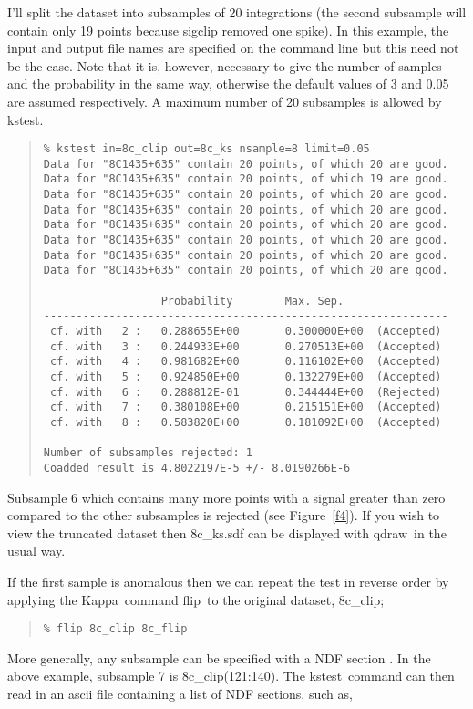 \documentclass[twoside,11pt,fleqn]{article}
\newenvironment{myquote}{\begin{quote}\begin{small}}{\end{small}\end{quote}}
\newcommand{\Kappa}{\xref{{\sc Kappa}}{sun95}{}}
\newcommand{\task}[1]{{\sf #1}}
\newcommand{\qdraw}{\xref{\task{qdraw}}{sun216}{QDRAW}}
\newcommand{\kstest}{\xref{\task{kstest}}{sun95}{KSTEST}}
\newcommand{\flip}{\xref{\task{flip}}{sun95}{FLIP}}
\newcommand{\xref}[3]{#1}
\begin{document}
I'll split the dataset into subsamples of 20 integrations (the second
subsample will contain only 19 points because sigclip removed one
spike). In this example, the input and output file names are specified
on the command line but this need not be the case.  Note that it is,
however, necessary to give the number of samples and the probability
in the same way, otherwise the default values of 3 and 0.05 are
assumed respectively. A maximum number of 20 subsamples is allowed by
\kstest.

\begin{myquote}
\begin{verbatim}
% kstest in=8c_clip out=8c_ks nsample=8 limit=0.05
Data for "8C1435+635" contain 20 points, of which 20 are good.
Data for "8C1435+635" contain 20 points, of which 19 are good.
Data for "8C1435+635" contain 20 points, of which 20 are good.
Data for "8C1435+635" contain 20 points, of which 20 are good.
Data for "8C1435+635" contain 20 points, of which 20 are good.
Data for "8C1435+635" contain 20 points, of which 20 are good.
Data for "8C1435+635" contain 20 points, of which 20 are good.
Data for "8C1435+635" contain 20 points, of which 20 are good.
 
                  Probability        Max. Sep.
--------------------------------------------------------------
 cf. with   2 :   0.288655E+00       0.300000E+00  (Accepted)
 cf. with   3 :   0.244933E+00       0.270513E+00  (Accepted)
 cf. with   4 :   0.981682E+00       0.116102E+00  (Accepted)
 cf. with   5 :   0.924850E+00       0.132279E+00  (Accepted)
 cf. with   6 :   0.288812E-01       0.344444E+00  (Rejected)
 cf. with   7 :   0.380108E+00       0.215151E+00  (Accepted)
 cf. with   8 :   0.583820E+00       0.181092E+00  (Accepted)
 
Number of subsamples rejected: 1
Coadded result is 4.8022197E-5 +/- 8.0190266E-6
\end{verbatim}
\end{myquote}

Subsample 6 which contains many more points with a signal greater than
zero compared to the other subsamples is rejected (see Figure~\ref{f4}).  If
you wish to view the truncated dataset then 8c\_ks.sdf can be
displayed with \qdraw\ in the usual way.

If the first sample is anomalous then we can repeat the test in
reverse order by applying the \Kappa\ command \flip\ to the
original dataset, 8c\_clip;

\begin{myquote}
\begin{verbatim}
% flip 8c_clip 8c_flip
\end{verbatim}
\end{myquote}
More generally, any subsample can be specified with a 
\xref{NDF section}{sun33}{ndf_sections} \cite{ndf}. In the above 
example, subsample 7 is 8c\_clip(121:140). The \kstest\ command can then
read in an ascii file containing a list of NDF sections, such as,
\end{document}
